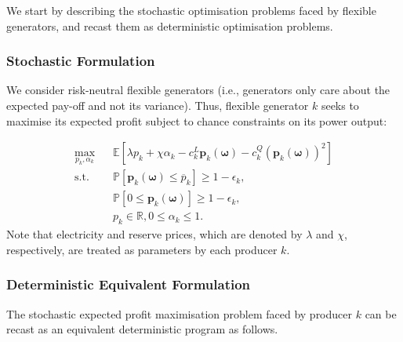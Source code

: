 \documentclass{article}
\begin{document}
We start by describing the stochastic optimisation problems faced by flexible generators, and recast them as deterministic optimisation problems.

\subsubsection{Stochastic Formulation}

We consider risk-neutral flexible generators (i.e., generators only care about the expected pay-off and not its variance). Thus, flexible generator $k$ seeks to maximise its expected profit subject to chance constraints on its power output:

\begin{align}
\underset{p_k, \alpha_k}{\max} \hspace{10pt} & \mathbb{E}[\lambda p_k + \chi \alpha_k - c_k^L \mathbf{p}_k(\boldsymbol{\omega}) - c_k^Q (\mathbf{p}_k(\boldsymbol{\omega}))^2]\\
\mbox{s.t. } & \mathbb{P}[\mathbf{p}_k(\boldsymbol{\omega}) \le \overline{p}_k] \ge 1 - \epsilon_k,\\
& \mathbb{P}[0 \le \mathbf{p}_k(\boldsymbol{\omega})] \ge 1 - \epsilon_k,\\
&p_k \in \mathbb{R}, 0 \le \alpha_k \le 1.
\end{align}
Note that electricity and reserve prices, which are denoted by $\lambda$ and $\chi$, respectively, are treated as parameters by each producer $k$.
\subsubsection{Deterministic Equivalent Formulation}

The stochastic expected profit maximisation problem faced by producer $k$ can be recast as an equivalent deterministic program as follows. 
\end{document}
